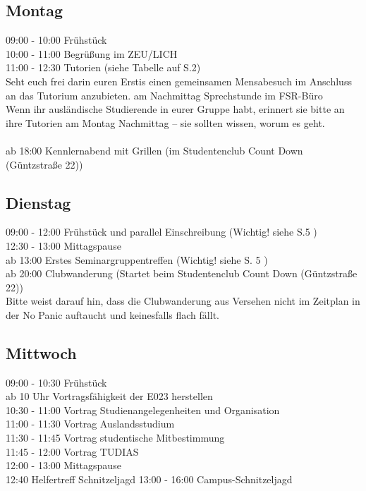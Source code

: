 \documentclass[a4paper,12pt]{report}
\begin{document}
\subsection{Montag}
09:00 - 10:00 Frühstück\\
10:00 - 11:00 Begrüßung im ZEU/LICH\\
11:00 - 12:30 Tutorien (siehe Tabelle auf S.2)\\
Seht euch frei darin euren Erstis einen gemeinsamen Mensabesuch im Anschluss an das Tutorium anzubieten.
am Nachmittag Sprechstunde im FSR-Büro\\
Wenn ihr ausländische Studierende in eurer Gruppe habt, erinnert sie bitte an ihre Tutorien am Montag Nachmittag – sie sollten wissen, worum es geht.\\
\\
ab 18:00 Kennlernabend mit Grillen (im Studentenclub Count Down (Güntzstraße 22))\\

\subsection{Dienstag}
09:00 - 12:00 Frühstück und parallel Einschreibung (Wichtig! siehe S.5 )\\
12:30 - 13:00 Mittagspause \\
ab 13:00  Erstes Seminargruppentreffen (Wichtig! siehe S. 5 )
\\
ab 20:00 Clubwanderung (Startet beim Studentenclub Count Down (Güntzstraße 22))\\
Bitte weist darauf hin, dass die Clubwanderung aus Versehen nicht im Zeitplan in der No Panic auftaucht und keinesfalls flach fällt.

\subsection{Mittwoch}
09:00 - 10:30 Frühstück\\
ab 10 Uhr Vortragsfähigkeit der E023 herstellen\\
10:30 - 11:00 Vortrag Studienangelegenheiten und Organisation\\
11:00 - 11:30 Vortrag Auslandsstudium \\
11:30 - 11:45 Vortrag studentische Mitbestimmung \\
11:45 - 12:00 Vortrag TUDIAS \\
12:00 - 13:00 Mittagspause \\
12:40 Helfertreff Schnitzeljagd
13:00 - 16:00 Campus-Schnitzeljagd \\
\end{document}
